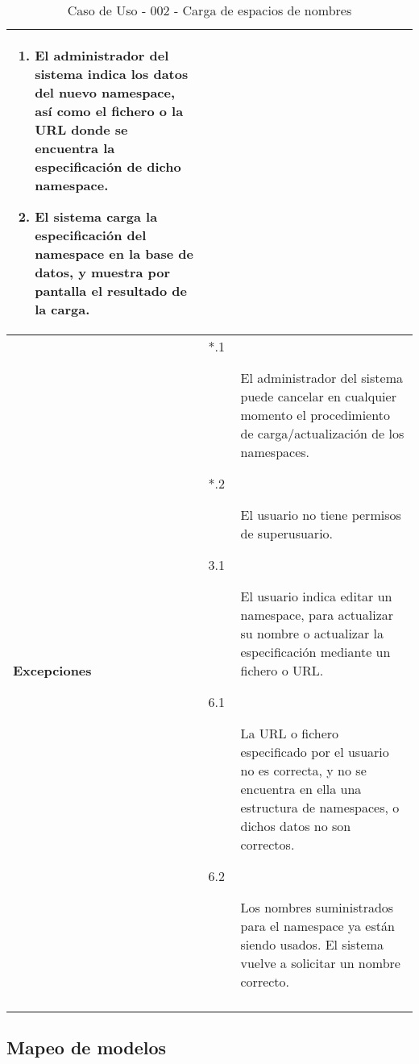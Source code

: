 \begin{center}
\begin{longtable}{||p{3.4cm}|p{12cm}||}
\begin{enumerate}
                \item El administrador del sistema indica los datos del nuevo
                       namespace, así como el fichero o la URL donde se
                       encuentra la especificación de dicho namespace.
                \item El sistema carga la especificación del namespace en la
                       base de datos, y muestra por pantalla el resultado de la
                       carga.
             \end{enumerate}\\
 \hline \bf Excepciones &
             \begin{description}
                \item[*.1] El administrador del sistema puede cancelar en
                          cualquier momento el procedimiento de
                          carga/actualización de los namespaces.
                \item[*.2] El usuario no tiene permisos de superusuario.
                \item[3.1] El usuario indica editar un namespace, para
                          actualizar su nombre o actualizar la especificación
                          mediante un fichero o URL.
                \item[6.1] La URL o fichero especificado por el usuario no es
                          correcta, y no se encuentra en ella una estructura de
                          namespaces, o dichos datos no son correctos.
                \item[6.2] Los nombres suministrados para el namespace ya están
                          siendo usados. El sistema vuelve a solicitar un nombre
                          correcto.
             \end{description}\\
\hline
\hline
\caption{\label{tab:caso002} Caso de Uso - 002 - Carga de espacios de nombres}
\end{longtable}
\end{center}


\subsection{Mapeo de modelos}

